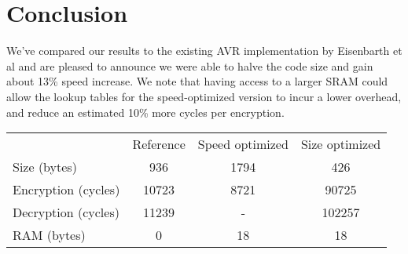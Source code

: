 \documentclass{llncs}
\begin{document}
\section{Conclusion}
We've compared our results to the existing AVR implementation by Eisenbarth et al \cite{eisenbarth2012compact} and are pleased to announce we were able to halve the code size and gain about 13\% speed increase.
We note that having access to a larger SRAM could allow the lookup tables for the speed-optimized version to incur a lower overhead, and reduce an estimated 10\% more cycles per encryption. 
\\

	\begin{tabular}{ l | c | c | c }
                & Reference & Speed optimized & Size optimized \\
        Size (bytes) & 936 & 1794 & 426 \\
        Encryption (cycles) & 10723 & 8721 & 90725 \\
        Decryption (cycles) & 11239 & - & 102257 \\
        RAM (bytes) & 0 & 18 & 18
	\end{tabular}

{}

\end{document}
